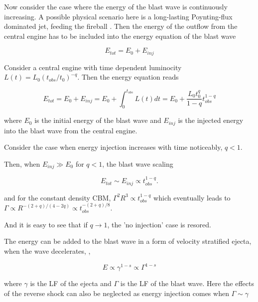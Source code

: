 Now consider the case where the energy of the blast wave is continuously increasing. A possible physical scenario here is a long-lasting Poynting-flux dominated jet, feeding the fireball . 
Then the energy of the outflow from the central engine has to be included into the energy equation of the blast wave

\begin{equation}
E_{tot} = E_0 + E_{inj}
\end{equation}

Consider a central engine with time dependent luminocity  $L(t) = L_0 (t_{obs}/t_0)^{-q}$. Then the energy equation reads

\begin{equation}
E_{tot} = E_0 + E_{inj} = E_0 + \int_{0}^{t_{obs}} L(t)dt = E_0 + \frac{L_0 t_0^q}{1-q}t_{obs}^{1-q}
\end{equation}

where $E_0$ is the initial energy of the blast wave and $E_{inj}$ is the injected energy into the blast wave from the central engine.

Consider the case when energy injection increases with time noticeably, $q<1$.

Then, when $E_{inj} \gg E_0$ for $q<1$, the blast wave scaling 

\begin{equation}
E_{tot} \sim E_{inj} \propto t_{obs}^{1-q}.
\end{equation}

and for the constant density \ac{CBM}, $\Gamma^2 R^3 \propto t_{obs}^{1-q}$ which eventually leads to $\Gamma\propto R^{-(2+q)/(4-2q)}\propto t_{obs}^{-(2+q)/8}$.

And it is easy to see that if $q\rightarrow 1$, the 'no injection' case is resored.


The energy can be added to the blast wave in a form of velocity stratified ejecta, when the wave decelerates, \eg,

\begin{equation}
E\propto \gamma^{1-s}\propto\Gamma^{1-s}
\end{equation}

where $\gamma$ is the \ac{LF} of the ejecta and $\Gamma$ is the \ac{LF} of the blast wave.
Here the effects of the reverse shock can also be neglected as energy injection comes when $\Gamma\sim\gamma$ 

